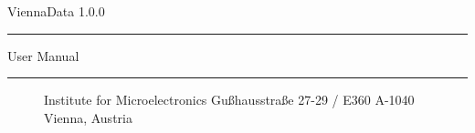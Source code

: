 
\begin{titlepage}

\vspace*{3cm}
\Huge{ViennaData 1.0.0} 
\rule[0.0cm]{8.7cm}{0.05cm}
\begin{flushright}
\Large{User Manual}
\end{flushright}

\vspace{13cm}
\rule[0.0cm]{16.0cm}{0.05cm}
\begin{figure}[!ht]
   \vspace{-1.0cm}
   \centering
   \begin{minipage}{3cm}
   \end{minipage}
   \hfill
   \hspace{-0.5cm}
   \begin{minipage}{5.5cm}
      \vspace{0.5cm}
      \begin{center}
      Institute for Microelectronics\newline
      Gu\ss hausstra\ss e 27-29 / E360\newline 
      A-1040 Vienna, Austria\newline
      \end{center}
   \end{minipage}   
   \hfill   
   \begin{minipage}{2.6cm}
   \end{minipage}
\end{figure}

\end{titlepage}





